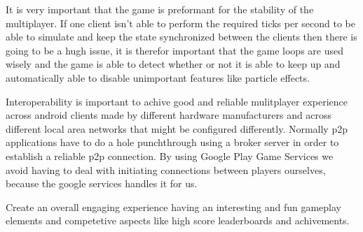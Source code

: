 	It is very important that the game is preformant for the stability of the multiplayer. If one client isn't able to perform the required ticks per second to be able to simulate	and keep the state synchronized between the clients then there is going to be a hugh issue, it is therefor important that the game loops are used wisely and the game is able to detect whether or not it is able to keep up and automatically able to disable unimportant features like particle effects.

	Interoperability is important to achive good and reliable mulitplayer experience across android clients made by different hardware manufacturers and across different local area networks that might be configured differently. Normally p2p applications have to do a hole punchthrough using a broker server in order to establish a reliable p2p connection. By using Google Play Game Services we avoid having to deal with initiating connections between players ourselves, because the google services handles it for us.

	Create an overall engaging experience having an interesting and fun gameplay elements and competetive aspects	like high score leaderboards and achivements.
